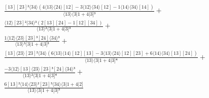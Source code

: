 \documentclass[varwidth, border=5pt]{standalone}
\begin{document}
\begin{my}
$\begin{gathered}
\scriptscriptstyle\frac{[13][23]²⟨34⟩(4⟨13⟩⟨24⟩[12]-3⟨12⟩⟨34⟩[12]-1⟨14⟩⟨34⟩[14])}{⟨13⟩⟨3|1+4|3]³} +\\
\scriptscriptstyle\frac{⟨12⟩[23]²⟨34⟩³(2[13][24]-1[12][34])}{⟨13⟩²⟨3|1+4|3]³} +\\
\scriptscriptstyle\frac{1⟨12⟩⟨23⟩[23]³[24]⟨34⟩³}{⟨13⟩³⟨3|1+4|3]³} +\\
\scriptscriptstyle\frac{[13]⟨23⟩[23]²⟨34⟩(6⟨13⟩⟨14⟩[12][13]-3⟨13⟩⟨24⟩[12][23]+6⟨14⟩⟨34⟩[13][24])}{⟨13⟩⟨3|1+4|3]⁴} +\\
\scriptscriptstyle\frac{-3⟨12⟩[13]⟨23⟩[23]³[24]⟨34⟩³}{⟨13⟩²⟨3|1+4|3]⁴} +\\
\scriptscriptstyle\frac{6[13]²⟨14⟩⟨23⟩²[23]³⟨34⟩⟨3|1+4|2]}{⟨13⟩⟨3|1+4|3]⁵} \phantom{+}
\end{gathered}$
\end{my}
\end{document}
